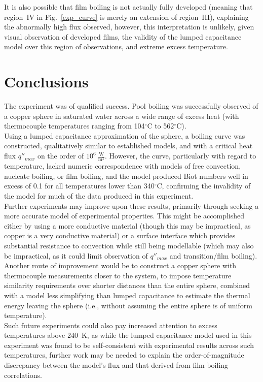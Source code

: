 \documentclass[12pt]{article}
\newcommand{\degr}{$^\circ$}
\newcommand{\degC}{\degr C\xspace}
\newcommand{\figref}[1]{Fig.~\ref{#1}}
\begin{document}
It is also possible that film boiling is not actually fully developed (meaning that region~IV in \figref{exp_curve} is merely an extension of region~III), explaining the abnormally high flux observed, however, this interpretation is unlikely, given visual observation of developed films, the validity of the lumped capacitance model over this region of observations, and extreme excess temperature.\\
\clearpage
\section{Conclusions}\label{sec:conc}
The experiment was of qualified success.
Pool boiling was successfully observed of a copper sphere in saturated water across a wide range of excess heat (with thermocouple temperatures ranging from 104\degC to 562\degC).\\

Using a lumped capacitance approximation of the sphere, a boiling curve was constructed, qualitatively similar to established models, and with a critical heat flux $q''_{max}$ on the order of $10^6~\mathrm{\frac{W}{m^2}}$.
However, the curve, particularly with regard to temperature, lacked numeric correspondence with models of free convection, nucleate boiling, or film boiling, and the model produced Biot numbers well in excess of 0.1 for all temperatures lower than 340\degC, confirming the invalidity of the model for much of the data produced in this experiment.\\

Further experiments may improve upon these results, primarily through seeking a more accurate model of experimental properties.
This might be accomplished either by using a more conductive material (though this may be impractical, as copper is a very conductive material) or a surface interface which provides substantial resistance to convection while still being modellable (which may also be impractical, as it could limit observation of $q''_{max}$ and transition/film boiling).
Another route of improvement would be to construct a copper sphere with thermocouple measurements closer to the system, to impose temperature similarity requirements over shorter distances than the entire sphere, combined with a model less simplifying than lumped capacitance to estimate the thermal energy leaving the sphere (i.e., without assuming the entire sphere is of uniform temperature).\\

Such future experiments could also pay increased attention to excess temperatures above 240~K, as while the lumped capacitance model used in this experiment was found to be self-consistent with experimental results across such temperatures, further work may be needed to explain the order-of-magnitude discrepancy between the model's flux and that derived from film boiling correlations.
\clearpage
\printbibliography
\clearpage
\appendix
\end{document}
